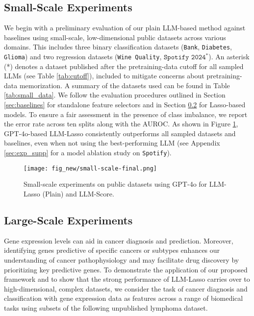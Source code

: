 \subsection{Small-Scale Experiments}\label{subsec:samll_scale}
We begin with a preliminary evaluation of our plain LLM-based method against baselines using small-scale, low-dimensional public datasets across various domains. This includes three binary classification datasets (\texttt{Bank}, \texttt{Diabetes}, \texttt{Glioma}) and two regression datasets (\texttt{Wine Quality}, $\texttt{Spotify 2024}^*$). An asterisk (*) denotes a dataset published after the pretraining-data cutoff for all sampled LLMs (see Table \ref{tab:cutoff}), included to mitigate concerns about pretraining-data memorization. A summary of the datasets used can be found in Table \ref{tab:small_data}. We follow the evaluation procedures outlined in Section \ref{sec:baselines} for standalone feature selectors and in Section \ref{sec:large-scale-experiments} for Lasso-based models. To ensure a fair assessment in the presence of class imbalance, we report the error rate across ten splits along with the AUROC. As shown in Figure \ref{fig:small_scale}, GPT-4o-based LLM-Lasso consistently outperforms all sampled datasets and baselines, even when not using the best-performing LLM (see Appendix \ref{sec:exp_supp} for a model ablation study on \texttt{Spotify}).

\begin{figure}[h]
    \centering    \texttt{[image: fig\_new/small-scale-final.png]}
        \vspace{-1em}
    \caption{Small-scale experiments on public datasets using GPT-4o for LLM-Lasso (Plain) and LLM-Score.}
    \label{fig:small_scale}
\end{figure}

\subsection{Large-Scale Experiments}\label{sec:large-scale-experiments}
Gene expression levels can aid in cancer diagnosis and prediction. Moreover, identifying genes predictive of specific cancers or subtypes enhances our understanding of cancer pathophysiology and may facilitate drug discovery by prioritizing key predictive genes. To demonstrate the application of our proposed framework and to show that the strong performance of LLM-Lasso carries over to high-dimensional, complex datasets, we consider the task of cancer diagnosis and classification with gene expression data as features across a range of biomedical tasks using subsets of the following unpublished lymphoma dataset. 

